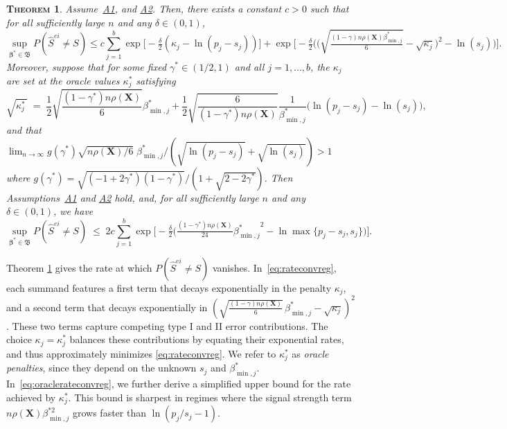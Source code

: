 \documentclass[
  12pt]{article}
\newcommand{\bbeta}{\boldsymbol{\beta}}
\newcommand{\bX}{\mathbf{X}}
\newtheorem{thm}{\textsc{Theorem}}[section]
\begin{document}
\begin{thm}\label{prop:fullrecovreg}
Assume~\hyperlink{lab:A1}{A1}, and \hyperlink{lab:A2}{A2}.
Then, there exists a constant $c>0$ such that for all sufficiently large $n$ and any $\delta \in (0,1)$,
\begin{equation}\label{eq:rateconvreg}
\sup_{\bbeta^*\in\mathfrak{B}}P(\hat{S}^{ei} \neq S)\leq c\sum_{j=1}^b\exp\big[-\tfrac{\delta}{2}(\kappa_j-\ln(p_j-s_j))\big] + 
   \exp\Big[- \tfrac{\delta}{2}\Big(\Big(\sqrt{\tfrac{(1-\gamma) n\rho(\bX)\beta_{\min,j}^*}{6}} - \sqrt{\kappa_j}\Big)^2 -\ln(s_j)\Big) \Big].
\end{equation}
Moreover, suppose that for some fixed $\gamma^*\in(1/2,1)$ and all $j=1,\ldots,b$, the $\kappa_j$ are set at the oracle values $\kappa^*_j$ satisfying
	\begin{equation} \label{eq:oraclepenreg}
\sqrt{\kappa^*_j\,} \;=\; \frac12\sqrt{\frac{(1-\gamma^*) n\rho(\bX)}{6}}{\beta_{\min,j}^*}+\frac12\sqrt{\frac{6}{(1-\gamma^*) n\rho(\bX)}}\frac{1}{\beta_{\min,j}^*}\big(\ln({p_j-s_j})-\ln({s_j})\big),
\end{equation}
and that $\lim_{n\to \infty}g(\gamma^*)\sqrt{ n\rho(\bX)/6}\;\beta_{\min,j}^* /(\sqrt{\ln(p_j-s_j)} + \sqrt{\ln(s_j)}) >1$ where $g(\gamma^*)=\sqrt{(-1 + 2 \gamma^*)(1-\gamma^*)}/(1 + \sqrt{2 - 2 \gamma^*})$.
Then Assumptions~\hyperlink{lab:A1}{A1} and \hyperlink{lab:A2}{A2} hold, and, for all sufficiently large $n$ and any $\delta \in (0,1)$, we have
\begin{equation}\label{eq:oraclerateconvreg}
\sup_{\bbeta^*\in\mathfrak{B}}P(\hat{S}^{ei} \neq S) \; \leq \; 2c \sum_{j=1}^b \exp\big[-\tfrac{\delta}{2}\big(\tfrac{(1-\gamma^*) n\rho(\bX)}{24}{\beta_{\min,j}^*}^2-\ln \max\{p_j-s_j,s_j\}\big)\big].
\end{equation}
\end{thm}

Theorem \ref{prop:fullrecovreg} gives the rate at which $P(\hat{S}^{ei} \neq S)$ vanishes.
In~\eqref{eq:rateconvreg}, each summand features a 
first term that decays exponentially in the penalty $\kappa_j$, and a second term that decays exponentially in 
$
(\sqrt{\tfrac{(1-\gamma)n\rho(\bX)}{6}}\,\beta_{\min,j}^* - \sqrt{\kappa_j})^2
$. These two terms capture competing type I and II error contributions.
The choice $\kappa_j=\kappa_j^*$ balances these contributions by equating their exponential rates, and thus approximately minimizes \eqref{eq:rateconvreg}.
We refer to $\kappa_j^*$ as \emph{oracle penalties}, since they depend on the unknown $s_j$ and $\beta_{\min,j}^*$. In~\eqref{eq:oraclerateconvreg}, we further derive a simplified upper bound for the rate achieved by $\kappa_j^*$.
This bound is sharpest in regimes where the signal strength term $n\rho(\bX)\beta_{\min,j}^{*2}$ grows faster than $\ln(p_j/s_j-1)$.
\end{document}
